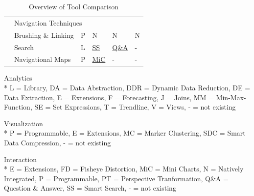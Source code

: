 \begin{table}[H]
\begin{tabular}{|l| l l l l l|}
        & \multicolumn{5}{l|}{\cellcolor{gray!30}Navigation Techniques}\\\cline{2-6}
        & Brushing \& Linking   & P & N & N & N \\
        & Search                &  L & \hyperlink{https://help.qlik.com/en-US/sense/2.2/Subsystems/Hub/Content/Search/search-tool.htm}{SS}& \hyperlink{https://powerbi.microsoft.com/en-us/documentation/powerbi-service-q-and-a/}{Q\&A}& - \\
        & Navigational Maps     & P & \hyperlink{https://help.qlik.com/en-US/sense/1.1/Subsystems/Hub/Content/Visualizations/BarChart/BarChart.htm}{MiC}  & -           & -\\
        \hline
    \end{tabular}
    \caption{Overview of Tool Comparison}
    \end{table}
    
    Analytics\\*
    L = Library, DA = Data Abstraction, DDR = Dynamic Data Reduction, DE = Data Extraction, E = Extensions, F = Forecasting, J = Joins, MM = Min-Max-Function, SE = Set Expressions, T = Trendline, V = Views, - = not existing
    \par 
    Visualization\\*
    P = Programmable, E = Extensions, MC = Marker Clustering, SDC = Smart Data Compression, - = not existing
    \par
    Interaction\\*
    E = Extensions, FD = Fisheye Distortion, MiC = Mini Charts, N = Natively Integrated, P = Programmable, PT = Perspective Tranformation, Q\&A = Question \& Answer,  SS = Smart Search, - = not existing
 
